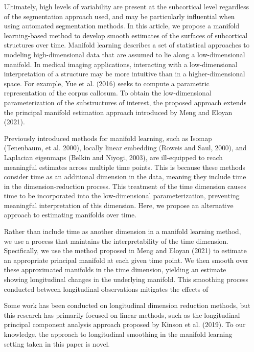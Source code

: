 \documentclass[11pt,reqno]{article}
\begin{document}
Ultimately, high levels of variability are present at the subcortical level regardless of the segmentation approach used, and may be particularly influential when using automated segmentation methods. In this article, we propose a manifold learning-based method to develop smooth estimates of the surfaces of subcortical structures over time. Manifold learning describes a set of statistical approaches to modeling high-dimensional data that are assumed to lie along a low-dimensional manifold. In medical imaging applications, interacting with a low-dimensional interpretation of a structure may be more intuitive than in a higher-dimensional space. For example, Yue et al. (2016) seeks to compute a parametric representation of the corpus callosum. To obtain the low-dimensional parameterization of the substructures of interest, the proposed approach extends the principal manifold estimation approach introduced by Meng and Eloyan (2021).

Previously introduced methods for manifold learning, such as Isomap (Tenenbaum, et al. 2000), locally linear embedding (Roweis and Saul, 2000), and Laplacian eigenmaps (Belkin and Niyogi, 2003), are ill-equipped to reach meaningful estimates across multiple time points. This is because these methods consider time as an additional dimension in the data, meaning they include time in the dimension-reduction process. This treatment of the time dimension causes time to be incorporated into the low-dimensional parameterization, preventing meaningful interpretation of this dimension. Here, we propose an alternative approach to estimating manifolds over time.

Rather than include time as another dimension in a manifold learning method, we use a process that maintains the interpretability of the time dimension. Specifically, we use the method proposed in Meng and Eloyan (2021) to estimate an appropriate principal manifold at each given time point. We then smooth over these approximated manifolds in the time dimension, yielding an estimate showing longitudinal changes in the underlying manifold. This smoothing process conducted between longitudinal observations mitigates the effects of 

Some work has been conducted on longitudinal dimension reduction methods, but this research has primarily focused on linear methods, such as the longitudinal principal component analysis approach proposed by Kinson et al. (2019). To our knowledge, the approach to longitudinal smoothing in the manifold learning setting taken in this paper is novel.
\end{document}
